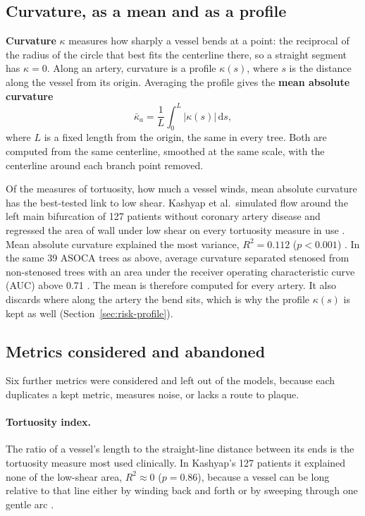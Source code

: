 \subsection{Curvature, as a mean and as a profile}

\textbf{Curvature} $\kappa$ measures how sharply a vessel bends at a point: the reciprocal of the radius of the circle that best fits the centerline there, so a straight segment has $\kappa = 0$.
Along an artery, curvature is a profile $\kappa(s)$, where $s$ is the distance along the vessel from its origin.
Averaging the profile gives the \textbf{mean absolute curvature}
\begin{equation}
  \bar\kappa_a = \frac{1}{L}\int_0^L \lvert \kappa(s) \rvert \, \mathrm{d}s,
  \label{eq:risk-kappa}
\end{equation}
where $L$ is a fixed length from the origin, the same in every tree.
Both are computed from the same centerline, smoothed at the same scale, with the centerline around each branch point removed.

Of the measures of tortuosity, how much a vessel winds, mean absolute curvature has the best-tested link to low shear.
Kashyap et al.\ simulated flow around the left main bifurcation of 127 patients without coronary artery disease and regressed the area of wall under low shear on every tortuosity measure in use \cite{kashyap2022tortuosity}.
Mean absolute curvature explained the most variance, $R^2 = 0.112$ ($p < 0.001$) \cite{kashyap2022tortuosity}.
In the same 39 ASOCA trees as above, average curvature separated stenosed from non-stenosed trees with an area under the receiver operating characteristic curve (AUC) above 0.71 \cite{zhang2024curvature}.
The mean is therefore computed for every artery.
It also discards where along the artery the bend sits, which is why the profile $\kappa(s)$ is kept as well (Section~\ref{sec:risk-profile}).

\subsection{Metrics considered and abandoned}

Six further metrics were considered and left out of the models, because each duplicates a kept metric, measures noise, or lacks a route to plaque.

\paragraph{Tortuosity index.}
The ratio of a vessel's length to the straight-line distance between its ends is the tortuosity measure most used clinically.
In Kashyap's 127 patients it explained none of the low-shear area, $R^2 \approx 0$ ($p = 0.86$), because a vessel can be long relative to that line either by winding back and forth or by sweeping through one gentle arc \cite{kashyap2022tortuosity}.

